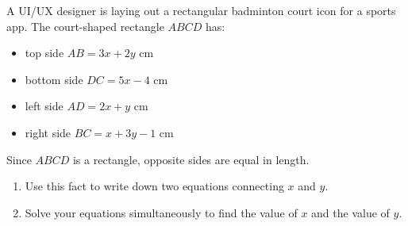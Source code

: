 \begin{question}
\noindent A UI/UX designer is laying out a rectangular badminton court icon for a sports app. The court-shaped rectangle $ABCD$ has:
\begin{itemize}
    \item top side $AB = 3x + 2y$ cm
    \item bottom side $DC = 5x - 4$ cm
    \item left side $AD = 2x + y$ cm
    \item right side $BC = x + 3y - 1$ cm
\end{itemize}

\begin{center}
\end{center}

\noindent Since $ABCD$ is a rectangle, opposite sides are equal in length.

\begin{enumerate}
    \item[(a)] Use this fact to write down two equations connecting $x$ and $y$.
    \vspace{2.5cm}

    \item[(b)] Solve your equations simultaneously to find the value of $x$ and the value of $y$.
    \vspace{5cm}
    \begin{flushright}
    \\[0.3cm]
    \end{flushright}
\end{enumerate}
\end{question}
